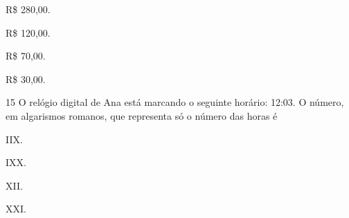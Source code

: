 \begin{escolha}
\item
  R\$ 280,00.
\item
  R\$ 120,00.
\item
  R\$ 70,00.
\item
  R\$ 30,00.
\end{escolha}


\num{15} O relógio digital de Ana está marcando o seguinte horário: 12:03.
O número, em algarismos romanos, que representa só o número das horas é

\begin{escolha}
\item
  IIX.
\item
  IXX.
\item
  XII.
\item
  XXI.
\end{escolha}


